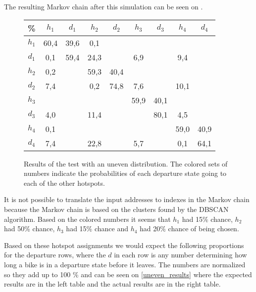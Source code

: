The resulting Markov chain after this simulation can be seen on .

\begin{figure}
	\centering
	\begin{tabular}{|c | c c c c c c c c|}
		\hline
		\% &      $ h_1 $ & $ d_1 $ & $ h_2 $ & $ d_2 $ & $ h_3 $ & $ d_3 $ & $ h_4 $ & $ d_4 $\\
		\hline
		$ h_1 $ & 60,4 &  39,6 &   0,1 &   &   &   &   &  \\
		$ d_1 $ & 0,1 &  59,4 &  {\color{red}24,3} &   &   {\color{red}6,9} &   &   {\color{red}9,4} &  \\
		$ h_2 $ & 0,2 &   &  59,3 &  40,4 &   &   &   &  \\
		$ d_2 $ & {\color{blue}7,4} &   &   0,2 &  74,8 &   {\color{blue}7,6} &   &  {\color{blue}10,1} &  \\
		$ h_3 $ & &   &   &   &  59,9 &  40,1 &   &  \\
		$ d_3 $ & {\color{orange}4,0} &   &  {\color{orange}11,4} &   &   &  80,1 &   {\color{orange}4,5} &  \\
		$ h_4 $ & 0,1 &   &   &   &   &   &  59,0 &  40,9\\
		$ d_4 $ & {\color{purple}7,4} &   &  {\color{purple}22,8} &   &   {\color{purple}5,7} &   &   0,1 &  64,1\\
		\hline
	\end{tabular}
	\caption{Results of the test with an uneven distribution. The colored sets of numbers indicate the probabilities of each departure state going to each of the other hotspots.}\label{test_uneven}
\end{figure}

It is not possible to translate the input addresses to indexes in the Markov chain because the Markov chain is based on the clusters found by the DBSCAN algorithm.
Based on the colored numbers it seems that $ h_1 $ had 15\% chance, $ h_2 $ had 50\% chance, $ h_3 $ had 15\% chance and $ h_4 $ had 20\% chance of being chosen.

Based on these hotspot assignments we would expect the following proportions for the departure rows, where the $ d $ in each row is any number determining how long a bike is in a departure state before it leaves.
The numbers are normalized so they add up to 100 \% and can be seen on \cref{uneven_results} where the expected results are in the left table and the actual results are in the right table.

